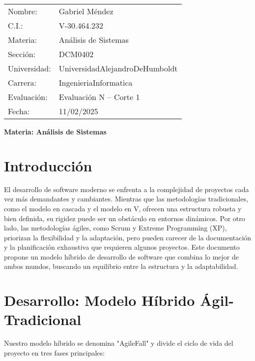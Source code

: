 \documentclass[12pt, spanish]{article}
\begin{document}
\begin{tabular}{ll}
Nombre: & Gabriel Méndez \\
C.I.: & V-30.464.232 \\
Materia: & Análisis de Sistemas \\
Sección: & DCM0402 \\
Universidad: & UniversidadAlejandroDeHumboldt \\
Carrera: & IngenieriaInformatica \\
Evaluación: & Evaluación N\textdegree1 – Corte 1 \\
Fecha: & 11/02/2025
\end{tabular}

\vspace{2cm}
\begin{center}
\Large \textbf{{Materia: Análisis de Sistemas}}
\end{center}

\section*{Introducción}

El desarrollo de software moderno se enfrenta a la complejidad de proyectos cada vez más demandantes y cambiantes.  Mientras que las metodologías tradicionales, como el modelo en cascada y el modelo en V, ofrecen una estructura robusta y bien definida, su rigidez puede ser un obstáculo en entornos dinámicos. Por otro lado, las metodologías ágiles, como Scrum y Extreme Programming (XP), priorizan la flexibilidad y la adaptación, pero pueden carecer de la documentación y la planificación exhaustiva que requieren algunos proyectos. Este documento propone un modelo híbrido de desarrollo de software que combina lo mejor de ambos mundos, buscando un equilibrio entre la estructura y la adaptabilidad.

\section*{Desarrollo: Modelo Híbrido Ágil-Tradicional}

Nuestro modelo híbrido se denomina "AgileFall" y divide el ciclo de vida del proyecto en tres fases principales:
\end{document}
